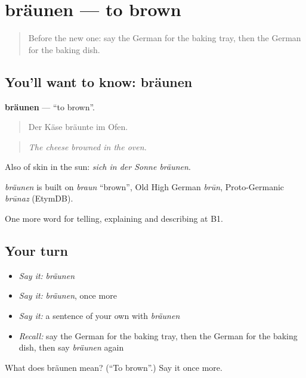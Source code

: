 \section[bräunen]{bräunen — to brown}

\label{lesson:GE-C326-braeunen}



\begin{quote}
Before the new one: say the German for the baking tray, then the German for the baking dish.
\end{quote}

\subsection*{You'll want to know: bräunen}
\textbf{bräunen} — \textquotedblleft{}to brown\textquotedblright{}.

\begin{quote}
Der Käse bräunte im Ofen.
\end{quote}

\begin{quote}
\emph{The cheese browned in the oven.}
\end{quote}

Also of skin in the sun: \emph{sich in der Sonne bräunen}.

\begin{cousinweb}
\emph{bräunen} is built on \emph{braun} \textquotedblleft{}brown\textquotedblright{}, Old High German \emph{brūn}, Proto-Germanic \emph{brūnaz} (EtymDB).
\end{cousinweb}

\begin{grammarlens}[title={What you've built}]
One more word for telling, explaining and describing at B1.
\end{grammarlens}

\subsection*{Your turn}
\begin{itemize}
\raggedright
  \item \emph{Say it:} \emph{bräunen}
  \item \emph{Say it:} \emph{bräunen}, once more
  \item \emph{Say it:} a sentence of your own with \emph{bräunen}
  \item \emph{Recall:} say the German for the baking tray, then the German for the baking dish, then say \emph{bräunen} again
\end{itemize}

\begin{tcolorbox}[breakable,colback=teal!4,colframe=teal!35!black,title={Before you move on}]
What does bräunen mean? (\textquotedblleft{}To brown\textquotedblright{}.) Say it once more.
\end{tcolorbox}
